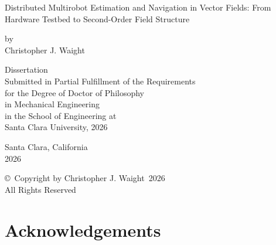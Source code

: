 \documentclass[12pt, letterpaper, oneside]{report}
\newcommand{\thesistitle}{Distributed Multirobot Estimation and Navigation in Vector Fields: From Hardware Testbed to Second-Order Field Structure}
\newcommand{\thesisauthor}{Christopher J. Waight}
\newcommand{\thesisdegreefield}{Mechanical Engineering}
\newcommand{\thesisyear}{2026}
\begin{document}
\begin{titlepage}
\begin{center}
  \vspace*{1in}

  {\Large \thesistitle}

  \vspace{0.6in}
  by \\[6pt]
  \thesisauthor

  \vspace{1.2in}
  Dissertation \\[6pt]
  Submitted in Partial Fulfillment of the Requirements \\
  for the Degree of Doctor of Philosophy \\
  in \thesisdegreefield \\[6pt]
  in the School of Engineering at \\
  Santa Clara University, \thesisyear

  \vspace{1in}
  Santa Clara, California \\
  \thesisyear
\end{center}
\end{titlepage}

\clearpage
\thispagestyle{plain}
\vspace*{3in}
\begin{center}
  \copyright\ Copyright by \thesisauthor\ \thesisyear \\
  All Rights Reserved
\end{center}
\clearpage

\chapter*{Acknowledgements}

\end{document}
